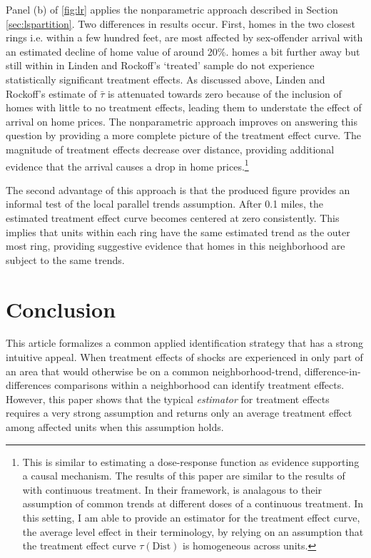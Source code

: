 \documentclass[12pt]{article}
\newcommand{\dist}{\text{Dist}}
\begin{document}
Panel (b) of \autoref{fig:lr} applies the nonparametric approach described in Section \ref{sec:lspartition}. Two differences in results occur. First, homes in the two closest rings i.e. within a few hundred feet, are most affected by sex-offender arrival with an estimated decline of home value of around 20\%. homes a bit further away but still within in Linden and Rockoff's `treated' sample do not experience statistically significant treatment effects. As discussed above, Linden and Rockoff's estimate of $\bar{\tau}$ is attenuated towards zero because of the inclusion of homes with little to no treatment effects, leading them to understate the effect of arrival on home prices. The nonparametric approach improves on answering this question by providing a more complete picture of the treatment effect curve. The magnitude of treatment effects decrease over distance, providing additional evidence that the arrival causes a drop in home prices.\footnote{This is similar to estimating a dose-response function as evidence supporting a causal mechanism. The results of this paper are similar to the results of \citet{Callaway_Goodman-Bacon_SantAnna_2021} with continuous treatment. In their framework,  is analagous to their assumption of common trends at different doses of a continuous treatment. In this setting, I am able to provide an estimator for the treatment effect curve, the average level effect in their terminology, by relying on an assumption that the treatment effect curve $\tau(\dist)$ is homogeneous across units.} 

The second advantage of this approach is that the produced figure provides an informal test of the local parallel trends assumption. After 0.1 miles, the estimated treatment effect curve becomes centered at zero consistently. This implies that units within each ring have the same estimated trend as the outer most ring, providing suggestive evidence that homes in this neighborhood are subject to the same trends. 

\section{Conclusion}

This article formalizes a common applied identification strategy that has a strong intuitive appeal. When treatment effects of shocks are experienced in only part of an area that would otherwise be on a common neighborhood-trend, difference-in-differences comparisons within a neighborhood can identify treatment effects. However, this paper shows that the typical \emph{estimator} for treatment effects requires a very strong assumption and returns only an average treatment effect among affected units when this assumption holds. 
\end{document}
